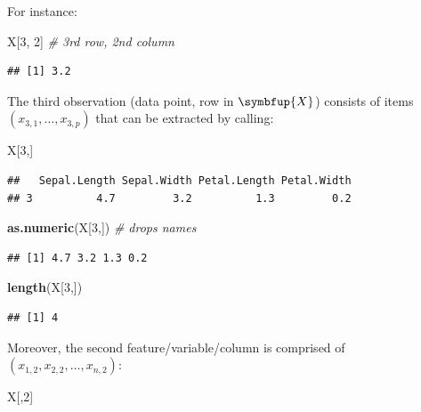 \documentclass[10pt,b5paper,krantz1]{krantz}
\newenvironment{Shaded}{\begin{snugshade}}{\end{snugshade}}
\newcommand{\CommentTok}[1]{\textcolor[rgb]{0.37,0.37,0.37}{\textit{#1}}}
\newcommand{\DecValTok}[1]{\textcolor[rgb]{0.06,0.06,0.06}{#1}}
\newcommand{\KeywordTok}[1]{\textcolor[rgb]{0.27,0.27,0.27}{\textbf{#1}}}
\newcommand{\NormalTok}[1]{#1}
\renewcommand{\mathbf}[1]{\symbfup{#1}}
\begin{document}
For instance:

\begin{Shaded}
\begin{Highlighting}[]
\NormalTok{X[}\DecValTok{3}\NormalTok{, }\DecValTok{2}\NormalTok{] }\CommentTok{# 3rd row, 2nd column}
\end{Highlighting}
\end{Shaded}

\begin{verbatim}
## [1] 3.2
\end{verbatim}

The third observation (data point, row in \(\mathbf{X}\))
consists of items \((x_{3,1}, \dots, x_{3,p})\) that can be extracted by calling:

\begin{Shaded}
\begin{Highlighting}[]
\NormalTok{X[}\DecValTok{3}\NormalTok{,]}
\end{Highlighting}
\end{Shaded}

\begin{verbatim}
##   Sepal.Length Sepal.Width Petal.Length Petal.Width
## 3          4.7         3.2          1.3         0.2
\end{verbatim}

\begin{Shaded}
\begin{Highlighting}[]
\KeywordTok{as.numeric}\NormalTok{(X[}\DecValTok{3}\NormalTok{,]) }\CommentTok{# drops names}
\end{Highlighting}
\end{Shaded}

\begin{verbatim}
## [1] 4.7 3.2 1.3 0.2
\end{verbatim}

\begin{Shaded}
\begin{Highlighting}[]
\KeywordTok{length}\NormalTok{(X[}\DecValTok{3}\NormalTok{,])}
\end{Highlighting}
\end{Shaded}

\begin{verbatim}
## [1] 4
\end{verbatim}

Moreover, the second feature/variable/column
is comprised of
\((x_{1,2}, x_{2,2}, \dots, x_{n,2})\):

\begin{Shaded}
\begin{Highlighting}[]
\NormalTok{X[,}\DecValTok{2}\NormalTok{]}
\end{Highlighting}
\end{Shaded}
\end{document}
